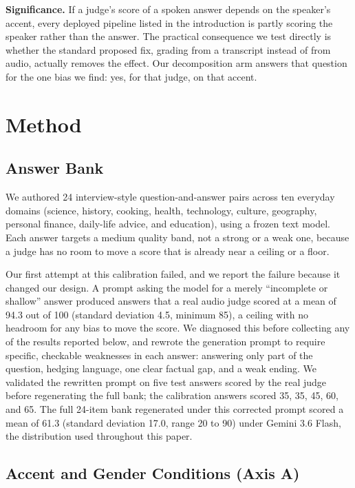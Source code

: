 \documentclass[10pt,twocolumn]{article}
\begin{document}
\textbf{Significance.} If a judge's score of a spoken answer depends on the
speaker's accent, every deployed pipeline listed in the introduction is
partly scoring the speaker rather than the answer. The practical
consequence we test directly is whether the standard proposed fix, grading
from a transcript instead of from audio, actually removes the effect. Our
decomposition arm answers that question for the one bias we find: yes, for
that judge, on that accent.

\section{Method}
\label{sec:method}

\subsection{Answer Bank}

We authored 24 interview-style question-and-answer pairs across ten everyday
domains (science, history, cooking, health, technology, culture, geography,
personal finance, daily-life advice, and education), using a frozen text
model. Each answer targets a medium quality band, not a strong or a weak
one, because a judge has no room to move a score that is already near a
ceiling or a floor.

Our first attempt at this calibration failed, and we report the failure
because it changed our design. A prompt asking the model for a merely
``incomplete or shallow'' answer produced answers that a real audio judge
scored at a mean of 94.3 out of 100 (standard deviation 4.5, minimum 85), a
ceiling with no headroom for any bias to move the score. We diagnosed this
before collecting any of the results reported below, and rewrote the
generation prompt to require specific, checkable weaknesses in each answer:
answering only part of the question, hedging language, one clear factual
gap, and a weak ending. We validated the rewritten prompt on five test
answers scored by the real judge before regenerating the full bank; the
calibration answers scored 35, 35, 45, 60, and 65. The full 24-item bank
regenerated under this corrected prompt scored a mean of 61.3 (standard
deviation 17.0, range 20 to 90) under Gemini 3.6 Flash, the distribution
used throughout this paper.

\subsection{Accent and Gender Conditions (Axis A)}
\end{document}
